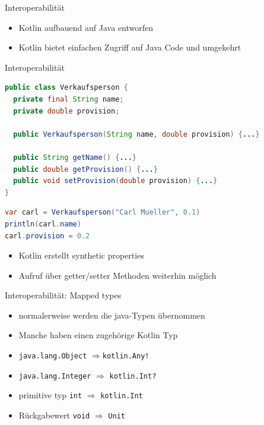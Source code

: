 \documentclass{beamer}
\begin{document}
\begin{frame}[fragile]{Interoperabilität}
  \begin{itemize}[<+->]
    \item Kotlin aufbauend auf Java entworfen
    \item Kotlin bietet einfachen Zugriff auf Java Code und umgekehrt
  \end{itemize}
\end{frame}

\begin{frame}[fragile]{Interoperabilität}
  \begin{lstlisting}[language=Java]
public class Verkaufsperson {
  private final String name;
  private double provision;

  public Verkaufsperson(String name, double provision) {...}

  public String getName() {...}
  public double getProvision() {...}
  public void setProvision(double provision) {...}
}
  \end{lstlisting}
  \pause
  \begin{lstlisting}[language=Java]
var carl = Verkaufsperson("Carl Mueller", 0.1)
println(carl.name)
carl.provision = 0.2
  \end{lstlisting}
  \pause
  \begin{itemize}
    \item Kotlin erstellt synthetic properties
    \item Aufruf über getter/setter Methoden weiterhin möglich
  \end{itemize}
\end{frame}

\begin{frame}[fragile]{Interoperabilität: Mapped types}
  \begin{itemize}[<+->]
    \item normalerweise werden die java-Typen übernommen
    \item Manche haben einen zugehörige Kotlin Typ
  \end{itemize}
  \pause[\thebeamerpauses] \vspace{0.2cm}
  \begin{itemize}[<+->]
    \item \texttt{java.lang.Object} $\Rightarrow $\texttt{kotlin.Any!}
    \item \texttt{java.lang.Integer} $\Rightarrow$ \texttt{kotlin.Int?}
    \item primitive typ \texttt{int} $\Rightarrow$ \texttt{kotlin.Int}
    \item Rückgabewert \texttt{void} $\Rightarrow$ \texttt{Unit}
  \end{itemize}
\end{frame}
\end{document}
